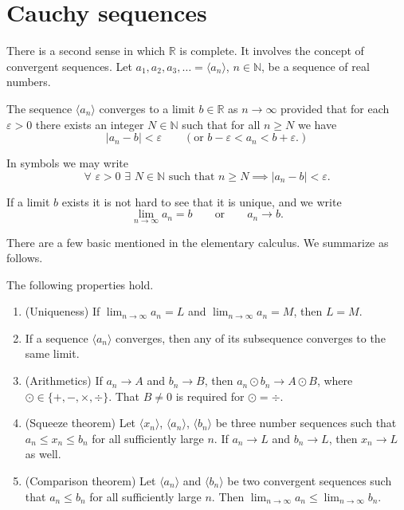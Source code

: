 \section{Cauchy sequences}
\label{sec:Cauchy}

There is a second sense in which $\mathbb R$ is complete.
It involves the concept of convergent sequences.
Let $a_1, a_2, a_3, \ldots = \langle a_n \rangle$, $n \in \mathbb N$, be a sequence of real numbers.

\begin{defn}
  The sequence $\langle a_n \rangle$ \textsf{converges to a limit} $b \in \mathbb R$ as $n \to \infty$ provided that for each $\varepsilon > 0$ there exists an integer $N \in \mathbb N$ such that for all $n \geqslant N$ we have
  \[
    |a_n - b| < \varepsilon \qquad (\text{or } b - \varepsilon < a_n < b + \varepsilon.)
  \]
\end{defn}
In symbols we may write
\[
  \forall\,\,\varepsilon > 0 \,\, \exists\,\, N \in \mathbb N \text{ such that } n \geqslant N \implies |a_n - b| < \varepsilon.
\]

If a limit $b$ exists it is not hard to see that it is unique, and we write
\[
  \lim_{n\to\infty} a_n = b \qquad \text{or} \qquad a_n \to b.
\]

There are a few basic mentioned in the elementary calculus.
We summarize as follows.


  \begin{prop}
    \label{prop:basicpropertyoflimit}
    The following properties hold.
    \begin{enumerate}[$(1)$]
      \item (Uniqueness) If $\displaystyle \lim_{n\to\infty} a_n = L$ and $\displaystyle \lim_{n\to\infty} a_n = M$, then $L=M$.
      \item If a sequence $\langle a_n \rangle$ converges, then any of its subsequence converges to the same limit.
      \item (Arithmetics) If $a_n \to A$ and $b_n \to B$, then $a_n \odot b_n \to A \odot B$, where $\odot \in \{ +, -, \times, \div \}$.  That $B \ne 0$ is required for $\odot = \div$.
      \item (Squeeze theorem) Let $\langle x_n \rangle$, $\langle a_n \rangle$, $\langle b_n \rangle$ be three number sequences such that $a_n \leqslant x_n \leqslant b_n$ for all sufficiently large $n$.  If $a_n \to L$ and $b_n \to L$, then $x_n \to L$ as well.
      \item (Comparison theorem) Let $\langle a_n \rangle$ and $\langle b_n \rangle$ be two convergent sequences such that $a_n \leqslant b_n$ for all sufficiently large $n$.  Then $\displaystyle \lim_{n\to\infty} a_n \leqslant \lim_{n\to\infty} b_n$.
    \end{enumerate}
  \end{prop}

